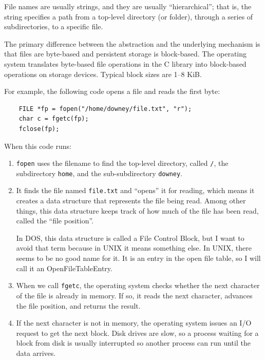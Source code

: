 \documentclass[12pt]{book}
\begin{document}
{File names are usually strings, and they are usually ``hierarchical'';
that is, the string specifies a path from a top-level directory (or
folder), through a series of subdirectories, to a specific file.

The primary difference between the abstraction and the underlying
mechanism is that files are byte-based and persistent storage is
block-based.  The operating system translates byte-based file operations 
in the C library into block-based operations on storage devices.
Typical block sizes are 1--8 KiB.

For example, the following code opens a file and reads the first byte:

\begin{verbatim}
    FILE *fp = fopen("/home/downey/file.txt", "r");
    char c = fgetc(fp);
    fclose(fp);
\end{verbatim}

When this code runs:

\begin{enumerate}

\item {\tt fopen} uses the filename to find the top-level directory,
  called \verb"/", the subdirectory {\tt home}, and the
  sub-subdirectory {\tt downey}.

\item It finds the file named {\tt file.txt} and ``opens'' it for
  reading, which means it creates a data structure that represents the
  file being read.  Among other things, this data structure
  keeps track of how much of the file has been read, called the ``file
  position''.

  In DOS, this data structure is called a File Control Block, but I
  want to avoid that term because in UNIX it means something else.  In
  UNIX, there seems to be no good name for it.  It is an entry in the
  open file table, so I will call it an OpenFileTableEntry.

\item When we call {\tt fgetc}, the operating system checks whether
  the next character of the file is already in memory.  If so, it
  reads the next character, advances the file position, and returns
  the result.

\item If the next character is not in memory, the operating
  system issues an I/O request to get the next block.  Disk drives are
  slow, so a process waiting for a block from disk is usually
  interrupted so another process can run until the data arrives.


\end{enumerate}}
\end{document}
